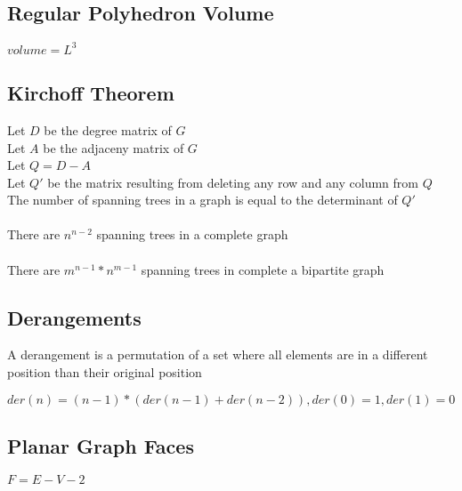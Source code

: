 \subsection{Regular Polyhedron Volume}

$volume = L^3$

\subsection{Kirchoff Theorem}
Let $D$ be the degree matrix of $G$\\
Let $A$ be the adjaceny matrix of $G$\\
Let $Q = D - A$\\
Let $Q'$ be the matrix resulting from deleting any row and any column from $Q$\\
The number of spanning trees in a graph is equal to the determinant of $Q'$\\
\\
There are $n^{n-2}$ spanning trees in a complete graph\\
\\
There are $m^{n-1}*n^{m-1}$ spanning trees in complete a bipartite graph

\subsection{Derangements}

A derangement is a permutation of a set where all elements are in a different position than their original position

$der(n) = (n-1)*(der(n-1)+der(n-2)), der(0) = 1, der(1) = 0$

\subsection{Planar Graph Faces}

$F = E - V - 2$
